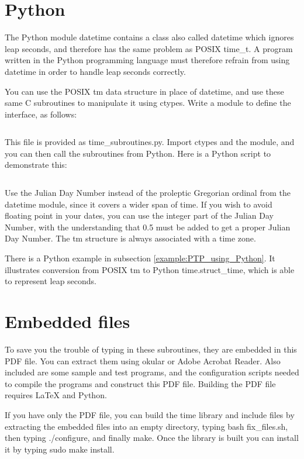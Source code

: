 \documentclass[letterpaper,twoside]{article}
\begin{document}
\section{Python}
The Python module datetime contains a class also called datetime
which ignores leap seconds, and therefore has the same problem
as POSIX {\ttfamily time\_t}.  A program written in the Python
programming language must therefore refrain from using datetime
in order to handle leap seconds correctly.

You can use the POSIX {\ttfamily tm} data structure in place of datetime,
and use these same C subroutines to manipulate it using
{\ttfamily ctypes}.
Write a module to define the interface, as follows:
\inputminted[firstline=28,lastline=385]{Python}{time_subroutines.py}
This file is provided as {\ttfamily time\_subroutines.py}.
Import ctypes and the module, and you can then call the subroutines
from Python.  Here is a Python script to demonstrate this:
\inputminted[firstline=27,lastline=98]{Python}{tests/demo_python.py}

Use the Julian Day Number instead of the proleptic Gregorian ordinal
from the datetime module, since it covers a wider span of time.
If you wish to avoid floating point in your dates, you can use
the integer part of the Julian Day Number, with the understanding
that \num{0.5} must be added to get a proper Julian Day Number.
The {\ttfamily tm} structure is always associated with a time zone.

There is a Python example in subsection \ref{example:PTP_using_Python}.
It illustrates conversion from POSIX {\ttfamily tm} to
Python {\ttfamily time.struct\_time}, which is able to represent leap seconds.

\section{Embedded files}
\label{section:Embedded_files}
To save you the trouble of typing in these subroutines, they are embedded
in this PDF file.  You can extract them using okular or Adobe Acrobat Reader.
Also included are some sample and test programs, and the configuration
scripts needed to compile the programs and construct this PDF file.
Building the PDF file requires {\LaTeX} and Python.

If you have only the PDF file, you can build the time library
and include files by
extracting the embedded files into an empty directory,
typing {\ttfamily bash fix\_files.sh}, 
then typing {\ttfamily ./configure},
and finally {\ttfamily make}.
Once the library is built you can install it by typing
{\ttfamily sudo make install}.
\end{document}
